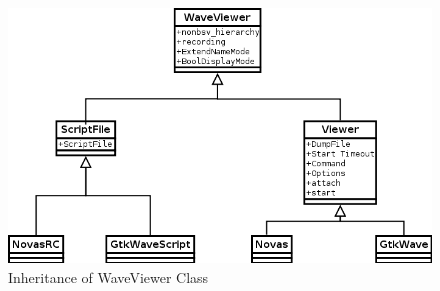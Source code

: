 \begin{figure}[htb]
\begin{center}
\includegraphics[width = 5 in]{figures/Wavestcl}
\caption{Inheritance of WaveViewer Class}
\label{Wavestcl}
\end{center}
\end{figure}





